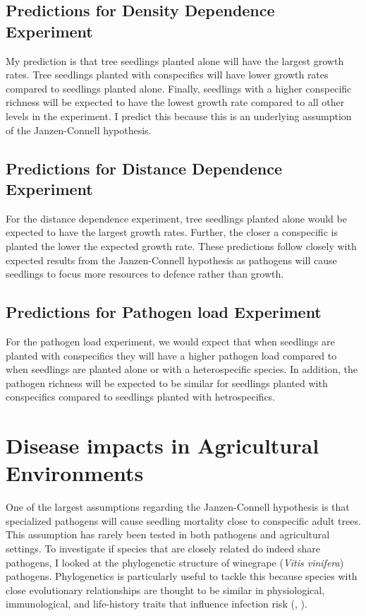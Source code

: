 \documentclass{article}
\begin{document}
\subsection{Predictions for Density Dependence Experiment}
My prediction is that tree seedlings planted alone will have the largest growth rates. Tree seedlings planted with conspecifics will have lower growth rates compared to seedlings planted alone. Finally, seedlings with a higher conspecific richness will be expected to have the lowest growth rate compared to all other levels in the experiment. I predict this because this is an underlying assumption of the Janzen-Connell hypothesis.   

\subsection{Predictions for Distance Dependence Experiment}
For the distance dependence experiment, tree seedlings planted alone would be expected to have the largest growth rates. Further, the closer a conspecific is planted the lower the expected growth rate. These predictions follow closely with expected results from the Janzen-Connell hypothesis as pathogens will cause seedlings to focus more resources to defence rather than growth. 

\subsection{Predictions for Pathogen load Experiment}
For the pathogen load experiment, we would expect that when seedlings are planted with conspecifics they will have a higher pathogen load compared to when seedlings are planted alone or with a heterospecific species. In addition, the pathogen richness will be expected to be similar for seedlings planted with conspecifics compared to seedlings planted with hetrospecifics. 


\section{Disease impacts in Agricultural Environments}
One of the largest assumptions regarding the Janzen-Connell hypothesis is that specialized pathogens will cause seedling mortality close to conspecific adult trees. This assumption has rarely been tested in both pathogens and agricultural settings. To investigate if species that are closely related do indeed share pathogens, I looked at the phylogenetic structure of winegrape (\textit{Vitis vinifera}) pathogens. Phylogenetics is particularly useful to tackle this because species with close evolutionary relationships are thought to be similar in physiological, immunological, and life-history traits that influence infection risk (\citep{Davies2008}, \citep{Gilbert2007}). 
\end{document}
